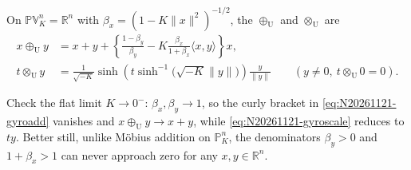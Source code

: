\begin{definition}
On \(\mathbb{PV}_K^n=\mathbb{R}^n\) with \(\beta_x=(1-K\|x\|^2)^{-1/2}\), the  \(\oplus_{\mathrm{U}}\) and  \(\otimes_{\mathrm{U}}\) are
\begin{align}
  x\oplus_{\mathrm{U}} y
  &= x + y + \left\{\frac{1-\beta_y}{\beta_y} - K\frac{\beta_x}{1+\beta_x}\langle x,y\rangle\right\}x,
  \label{eq:N20261121-gyroadd} \\
  t\otimes_{\mathrm{U}} y
  &= \frac{1}{\sqrt{-K}}\sinh\!\left(t\sinh^{-1}\!\bigl(\sqrt{-K}\|y\|\bigr)\right)\frac{y}{\|y\|}
  \qquad (y\neq 0,\ t\otimes_{\mathrm{U}} 0 = 0).
  \label{eq:N20261121-gyroscale}
\end{align}
\end{definition}

Check the flat limit \(K\to 0^-\): \(\beta_x,\beta_y\to 1\), so the curly bracket in \eqref{eq:N20261121-gyroadd} vanishes and \(x\oplus_{\mathrm{U}} y \to x+y\), while \eqref{eq:N20261121-gyroscale} reduces to \(ty\). Better still, unlike M\"obius addition on \(\mathbb{P}_K^n\), the denominators \(\beta_y>0\) and \(1+\beta_x>1\) can never approach zero for any \(x,y\in\mathbb{R}^n\).

